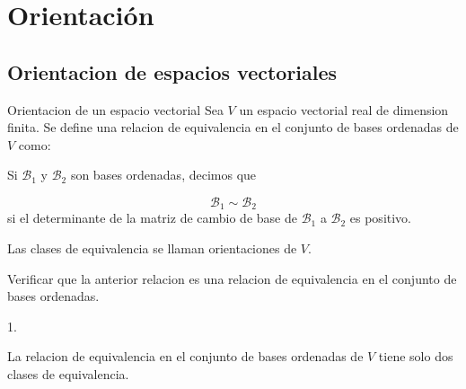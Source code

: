 \chapter{Orientación}
\label{ch:teo-24}
\section{Orientacion de espacios vectoriales}
\begin{bookdefinition}{Orientacion de un espacio vectorial}
Sea $V$ un espacio vectorial real de dimension finita. Se define una relacion de equivalencia en el conjunto de bases ordenadas de $V$ como:

Si $\mathcal B_1$ y $\mathcal B_2$ son bases ordenadas, decimos que

\[
\mathcal B_1\sim\mathcal B_2
\]
si el determinante de la matriz de cambio de base de $\mathcal B_1$ a $\mathcal B_2$ es positivo.

Las clases de equivalencia se llaman orientaciones de $V$.

\end{bookdefinition}
\begin{bookexercise}{}
Verificar que la anterior relacion es una relacion de equivalencia en el conjunto de bases ordenadas.

\end{bookexercise}
\begin{bookproof}{}
1.

\bookqed
\end{bookproof}
\begin{bookproposition}{}
La relacion de equivalencia en el conjunto de bases ordenadas de $V$ tiene solo dos clases de equivalencia.

\end{bookproposition}
